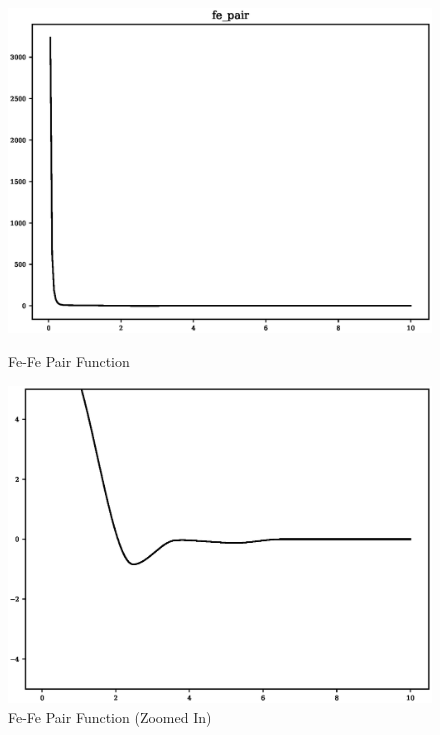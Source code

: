 \FloatBarrier
\begin{figure}[ht] 
  \begin{minipage}[b]{0.5\linewidth}
    \centering
    \includegraphics[width=.9\linewidth]{chapters/results_potential_fitting/pot_fepd_fcc_2/fe_pair.eps} 
    \caption{Fe-Fe Pair Function} 
  \end{minipage}%
  \begin{minipage}[b]{0.5\linewidth}
    \centering
    \includegraphics[width=.9\linewidth]{chapters/results_potential_fitting/pot_fepd_fcc_2/fe_pair_zoom.eps} 
    \caption{Fe-Fe Pair Function (Zoomed In)} 
  \end{minipage} 
  \begin{minipage}[b]{0.5\linewidth}
    \centering

\end{minipage}
\end{figure}
